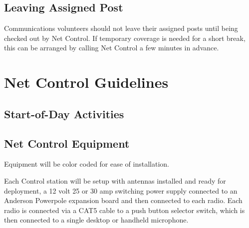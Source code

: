 \documentclass[pdflatex,letterpaper,twoside,12pt]{book}
\begin{document}

\section{Leaving Assigned Post}

Communications volunteers should not leave their assigned posts until being checked out by Net Control.  If temporary coverage is needed for a short break, this can be arranged by calling Net Control a few minutes in advance.


\chapter{Net Control Guidelines}

\section{Start-of-Day Activities}

\iffalse %
Equipment checks, opening script, etc
...and is this the best placement for this section?
\fi


\section{Net Control Equipment}

Equipment will be color coded for ease of installation.

Each Control station will be setup with antennas installed and ready for deployment, a 12 volt 25 or 30 amp switching power supply connected to an Anderson Powerpole expansion board and then connected to each radio. Each radio is connected via a CAT5 cable to a push button selector switch, which is then connected to a single desktop or handheld microphone.
\end{document}
